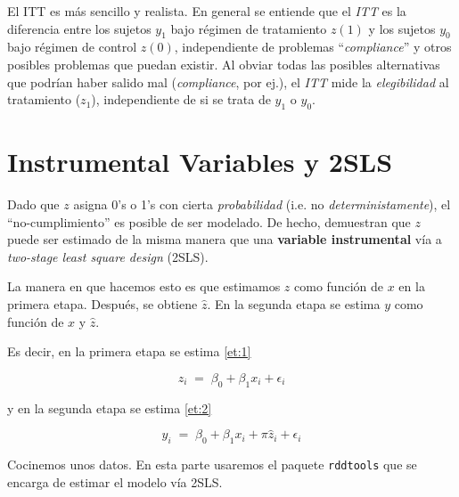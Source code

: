 \documentclass[onesided]{article}\usepackage[]{graphicx}\usepackage[]{color}
\begin{document}
El ITT es m\'as sencillo y realista. En general se entiende que el \emph{ITT} es la diferencia entre los sujetos $y_{1}$ bajo r\'egimen de tratamiento $z(1)$ y los sujetos $y_{0}$ bajo r\'egimen de control $z(0)$, independiente de problemas ``\emph{compliance}'' y otros posibles problemas que puedan existir. Al obviar todas las posibles alternativas que podr\'ian haber salido mal (\emph{compliance}, por ej.), el \emph{ITT} mide la \emph{elegibilidad} al tratamiento ($z_{1}$), independiente de si se trata de $y_{1}$ o $y_{0}$.


\section{Instrumental Variables y 2SLS}

Dado que $z$ asigna 0's o 1's con cierta \emph{probabilidad} (i.e. no \emph{deterministamente}), el ``no-cumplimiento'' es posible de ser modelado. De hecho, \textcite[]{Hahn2001a} demuestran que $z$ puede ser estimado de la misma manera que una {\bf variable instrumental} v\'ia a \emph{two-stage least square design} (2SLS). 

La manera en que hacemos esto es que estimamos $z$ como funci\'on de $x$ en la primera etapa. Despu\'es, se obtiene $\hat z$. En la segunda etapa se estima $y$ como funci\'on de $x$ y $\hat z$.

Es decir, en la primera etapa se estima \autoref{et:1}

\begin{equation}\label{et:1}
z_{i} \;=\; \beta_{0} + \beta_{1}x_{i} + \epsilon_{i}
\end{equation}

y en la segunda etapa se estima \autoref{et:2}

\begin{equation}\label{et:2}
y_{i} \;=\; \beta_{0} + \beta_{1}x_{i} + \pi \hat z_{i} + \epsilon_{i}
\end{equation}


Cocinemos unos datos. En esta parte usaremos el paquete \texttt{rddtools} que se encarga de estimar el modelo v\'ia 2SLS.
\end{document}

